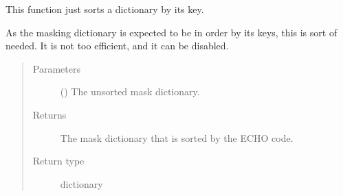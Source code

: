 \documentclass[letterpaper,10pt,english]{sphinxmanual}
\begin{document}

\begin{fulllineitems}
\label{\detokenize{python_docstrings/IfA_Smeargle.echo.echo_functions:IfA_Smeargle.echo.echo_functions.sort_masking_dictionary}}
This function just sorts a dictionary by its key.

As the masking dictionary is expected to be in order by its keys, this is sort of needed.
It is not too efficient, and it can be disabled.
\begin{quote}\begin{description}
\item[{Parameters}] \leavevmode
{} () \textendash{} The unsorted mask dictionary.

\item[{Returns}] \leavevmode
{} \textendash{} The mask dictionary that is sorted by the ECHO code.

\item[{Return type}] \leavevmode
dictionary

\end{description}\end{quote}

\end{fulllineitems}

\end{document}
